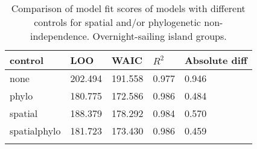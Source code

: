 \begin{longtable}{p{2cm}p{2cm}p{2cm}p{2cm}p{2cm}}
  \toprule
control & LOO & WAIC & $R^2$ & Absolute diff \\ 
  \midrule
none & 202.494 & 191.558 & 0.977 & 0.946 \\ 
  phylo & 180.775 & 172.586 & 0.986 & 0.484 \\ 
  spatial & 188.379 & 178.292 & 0.984 & 0.570 \\ 
  spatialphylo & 181.723 & 173.430 & 0.986 & 0.459 \\ 
   \bottomrule
\caption{Comparison of model fit scores of models with different controls for spatial and/or phylogenetic non-independence. Overnight-sailing island groups.} 
\label{model_fit_score_table_SBZR}
\end{longtable}
